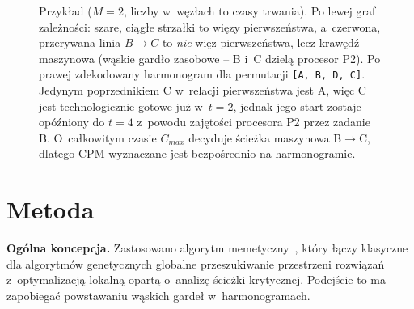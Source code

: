 \documentclass[12pt,a4paper]{article}
\begin{document}
\begin{figure}[H]
\centering
{}
\hspace{0.7cm}
\caption{Przykład ($M=2$, liczby w~węzłach to czasy trwania). Po lewej graf zależności: szare,
ciągłe strzałki to więzy pierwszeństwa, a~czerwona, przerywana linia $B\!\to\!C$ to \emph{nie}
więz pierwszeństwa, lecz krawędź maszynowa (wąskie gardło zasobowe -- B i~C dzielą procesor P2).
Po prawej zdekodowany harmonogram dla permutacji \texttt{[A, B, D, C]}. Jedynym poprzednikiem C
w~relacji pierwszeństwa jest A, więc C jest technologicznie gotowe już w~$t=2$, jednak jego start
zostaje opóźniony do $t=4$ z~powodu zajętości procesora P2 przez zadanie B. O~całkowitym czasie
$C_{max}$ decyduje ścieżka maszynowa B$\to$C, dlatego CPM wyznaczane jest bezpośrednio na
harmonogramie.}
\label{fig:przyklad}
\end{figure}

\section{Metoda}
\label{sec:metoda}
\textbf{Ogólna koncepcja.} Zastosowano algorytm memetyczny~\cite{moscato1989}, który łączy
klasyczne dla algorytmów genetycznych globalne przeszukiwanie przestrzeni rozwiązań z~optymalizacją
lokalną opartą o~analizę ścieżki krytycznej. Podejście to ma zapobiegać powstawaniu wąskich gardeł
w~harmonogramach.
\end{document}
